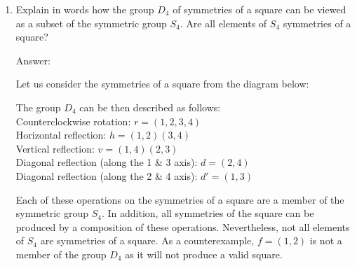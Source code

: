 \documentclass[11pt,twoside]{article}
\begin{document}
\begin{enumerate}
\vspace{0.5cm}

\item Explain in words how the group $D_4$ of symmetries of a square can be viewed as a subset of the symmetric group $S_4$.  Are all elements of $S_4$ symmetries of a square?

{\color{red}Answer:}

Let us consider the symmetries of a square from the diagram below:


The group $D_4$ can be then described as follows:\\
Counterclockwise rotation: $r = (1,2,3,4)$\\
Horizontal reflection: $h = (1,2)(3,4)$\\
Vertical reflection: $v = (1,4)(2,3)$\\
Diagonal reflection (along the 1 \& 3 axis): $d = (2,4)$\\
Diagonal reflection (along the 2 \& 4 axis): $d' = (1,3)$

Each of these operations on the symmetries of a square are a member of the symmetric group $S_4$.  In addition, all symmetries of the square can be produced by a composition of these operations.  Nevertheless, not all elements of $S_4$ are symmetries of a square.  As a counterexample, $f = (1,2)$ is not a member of the group $D_4$ as it will not produce a valid square.
\end{enumerate}
\end{document}
